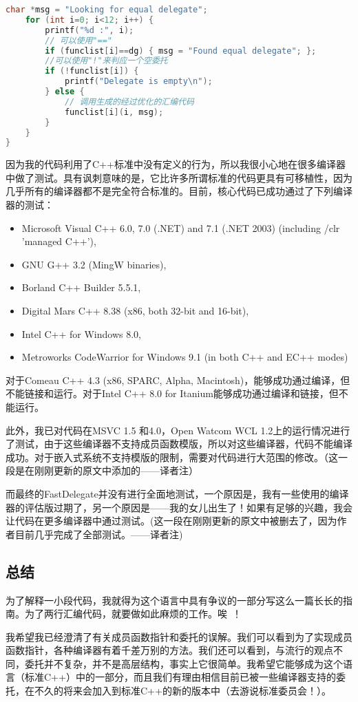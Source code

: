 \documentclass{article}
\begin{document}
\begin{CJK}{UTF8}{gbsn}
\begin{lstlisting}[language=c++]
    char *msg = "Looking for equal delegate";
    for (int i=0; i<12; i++) {
        printf("%d :", i);
        // 可以使用"=="
        if (funclist[i]==dg) { msg = "Found equal delegate"; };
        //可以使用"!"来判应一个空委托
        if (!funclist[i]) {
            printf("Delegate is empty\n");
        } else {
            // 调用生成的经过优化的汇编代码
            funclist[i](i, msg);
        }
    }
}
\end{lstlisting}
因为我的代码利用了C++标准中没有定义的行为，所以我很小心地在很多编译器中做了测试。具有讽刺意味的是，它比许多所谓标准的代码更具有可移植性，因为几乎所有的编译器都不是完全符合标准的。目前，核心代码已成功通过了下列编译器的测试：
\begin{itemize}
  \itemsep=-3pt
\item Microsoft Visual C++ 6.0, 7.0 (.NET) and 7.1 (.NET 2003) (including /clr 'managed C++'), 
\item GNU G++ 3.2 (MingW binaries), 
\item Borland C++ Builder 5.5.1, 
\item Digital Mars C++ 8.38 (x86, both 32-bit and 16-bit), 
\item Intel C++ for Windows 8.0, 
\item Metroworks CodeWarrior for Windows 9.1 (in both C++ and EC++ modes) 
\end{itemize}
对于Comeau C++ 4.3 (x86, SPARC, Alpha, Macintosh)，能够成功通过编译，但不能链接和运行。对于Intel C++ 8.0 for Itanium能够成功通过编译和链接，但不能运行。

此外，我已对代码在MSVC 1.5 和4.0，Open Watcom WCL 1.2上的运行情况进行了测试，由于这些编译器不支持成员函数模版，所以对这些编译器，代码不能编译成功。对于嵌入式系统不支持模版的限制，需要对代码进行大范围的修改。（这一段是在刚刚更新的原文中添加的——译者注）

而最终的FastDelegate并没有进行全面地测试，一个原因是，我有一些使用的编译器的评估版过期了，另一个原因是——我的女儿出生了！如果有足够的兴趣，我会让代码在更多编译器中通过测试。(这一段在刚刚更新的原文中被删去了，因为作者目前几乎完成了全部测试。——译者注)

\subsection{总结}
为了解释一小段代码，我就得为这个语言中具有争议的一部分写这么一篇长长的指南。为了两行汇编代码，就要做如此麻烦的工作。唉~！

我希望我已经澄清了有关成员函数指针和委托的误解。我们可以看到为了实现成员函数指针，各种编译器有着千差万别的方法。我们还可以看到，与流行的观点不同，委托并不复杂，并不是高层结构，事实上它很简单。我希望它能够成为这个语言（标准C++）中的一部分，而且我们有理由相信目前已被一些编译器支持的委托，在不久的将来会加入到标准C++的新的版本中（去游说标准委员会！）。


\end{CJK}
\end{document}
